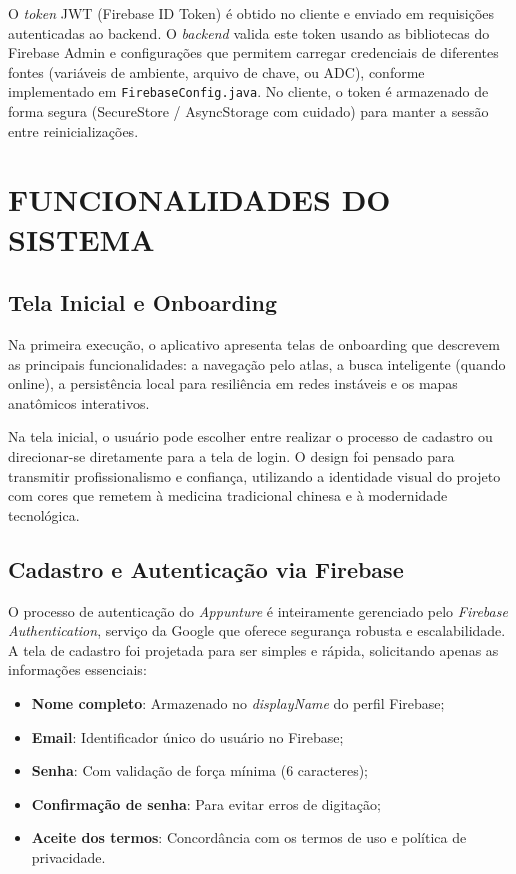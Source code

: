 O \textit{token} JWT (Firebase ID Token) é obtido no cliente e enviado em requisições autenticadas ao backend. O \textit{backend} valida este token usando as bibliotecas do Firebase Admin e configurações que permitem carregar credenciais de diferentes fontes (variáveis de ambiente, arquivo de chave, ou ADC), conforme implementado em \texttt{FirebaseConfig.java}. No cliente, o token é armazenado de forma segura (SecureStore / AsyncStorage com cuidado) para manter a sessão entre reinicializações.

\section{FUNCIONALIDADES DO SISTEMA} \label{sec:funcionalidades}


\subsection{Tela Inicial e Onboarding}

Na primeira execução, o aplicativo apresenta telas de onboarding que descrevem as principais funcionalidades: a navegação pelo atlas, a busca inteligente (quando online), a persistência local para resiliência em redes instáveis e os mapas anatômicos interativos.

Na tela inicial, o usuário pode escolher entre realizar o processo de cadastro ou direcionar-se diretamente para a tela de login. O design foi pensado para transmitir profissionalismo e confiança, utilizando a identidade visual do projeto com cores que remetem à medicina tradicional chinesa e à modernidade tecnológica.

\subsection{Cadastro e Autenticação via Firebase}

O processo de autenticação do \textit{Appunture} é inteiramente gerenciado pelo \textit{Firebase Authentication}, serviço da Google que oferece segurança robusta e escalabilidade. A tela de cadastro foi projetada para ser simples e rápida, solicitando apenas as informações essenciais:

\begin{itemize}
    \item \textbf{Nome completo}: Armazenado no \textit{displayName} do perfil Firebase;
    \item \textbf{Email}: Identificador único do usuário no Firebase;
    \item \textbf{Senha}: Com validação de força mínima (6 caracteres);
    \item \textbf{Confirmação de senha}: Para evitar erros de digitação;
    \item \textbf{Aceite dos termos}: Concordância com os termos de uso e política de privacidade.
\end{itemize}

